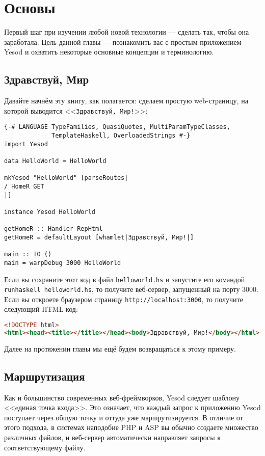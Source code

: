\chapter{Основы}\label{ch:basics}

Первый шаг при изучении любой новой технологии --- сделать так, чтобы она заработала. Цель
данной главы --- познакомить вас с простым приложением Yesod и охватить некоторые основные
концепции и терминологию.

\section{Здравствуй, Мир}

Давайте начнём эту книгу, как полагается: сделаем простую web-страницу, на которой
выводится <<\texttt{Здравствуй, Мир!}>>:

\begin{lstlisting}
{-# LANGUAGE TypeFamilies, QuasiQuotes, MultiParamTypeClasses,
             TemplateHaskell, OverloadedStrings #-}
import Yesod

data HelloWorld = HelloWorld

mkYesod "HelloWorld" [parseRoutes|
/ HomeR GET
|]

instance Yesod HelloWorld

getHomeR :: Handler RepHtml
getHomeR = defaultLayout [whamlet|Здравствуй, Мир!|]

main :: IO ()
main = warpDebug 3000 HelloWorld
\end{lstlisting}

Если вы сохраните этот код в файл \lstinline!helloworld.hs! и запустите его командой
\lstinline!runhaskell helloworld.hs!, то получите веб-сервер, запущенный на порту 3000.
Если вы откроете браузером страницу \lstinline'http://localhost:3000', то получите
следующий HTML-код:

\begin{lstlisting}[language=HTML]
<!DOCTYPE html>
<html><head><title></title></head><body>Здравствуй, Мир!</body></html>
\end{lstlisting}

Далее на протяжении главы мы ещё будем возвращаться к этому примеру.

\section{Маршрутизация}

Как и большинство современных веб-фреймворков, Yesod следует шаблону <<eдиная точка
входа>>. Это означает, что каждый запрос к приложению Yesod поступает через общую точку и
оттуда уже маршрутизируется. В отличие от этого подхода, в системах наподобие PHP и ASP вы
обычно создаете множество различных файлов, и веб-сервер автоматически направляет запросы
к соответствующему файлу.

